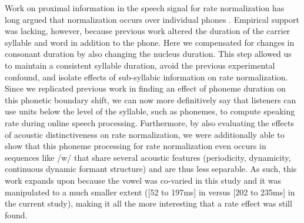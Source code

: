 \documentclass[preprint]{JASA}
\begin{document}
Work on proximal information in the speech signal for rate normalization has long argued that normalization occurs over individual phones \citep{diehlAuditoryBasisStimulus1989,newmanPerceptualNormalizationSpeaking1996}. Empirical support was lacking, however, because previous work altered the duration of the carrier syllable and word in addition to the phone. Here we compensated for changes in consonant duration by also changing the nucleus duration. This step allowed us to maintain a consistent syllable duration, avoid the previous experimental confound, and isolate effects of sub-syllabic information on rate normalization. Since we replicated previous work in finding an effect of phoneme duration on this phonetic boundary shift, we can now more definitively say that listeners can use units below the level of the syllable, such as phonemes, to compute speaking rate during online speech processing. Furthermore, by also evaluating the effects of acoustic distinctiveness on rate normalization, we were additionally able to show that this phoneme processing for rate normalization even occurs in sequences like /w\textsci/ that share several acoustic features (periodicity, dynamicity, continuous dynamic formant structure) and are thus less separable. As such, this work expands upon \citet{newmanPerceptualNormalizationSpeaking1996} because the vowel was co-varied in this study and it was manipulated to a much smaller extent ([52 to 197ms] in \citet{newmanPerceptualNormalizationSpeaking1996} versus [202 to 235ms] in the current study), making it all the more interesting that a rate effect was still found. 
\end{document}
